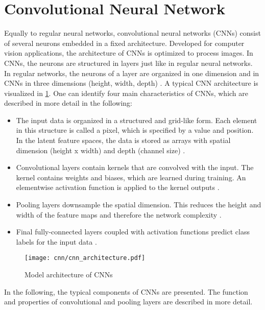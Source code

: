 \section{Convolutional Neural Network}

Equally to regular neural networks, convolutional neural networks (CNNs) consist of several neurons embedded in a fixed architecture. Developed for computer vision applications, the architecture of CNNs is optimized to process images. In CNNs, the neurons are structured in layers just like in regular neural networks. In regular networks, the neurons of a layer are organized in one dimension and in CNNs in three dimensions (height, width, depth) \cite{OShea2015}. A typical CNN architecture is visualized in \ref{fig:CNN_overview}. One can identify four main characteristics of CNNs, which are described in more detail in the following:

\begin{itemize}
    \item [1.] The input data is organized in a structured and grid-like form. Each element in this structure is called a pixel, which is specified by a value and position. In the latent feature spaces, the data is stored as arrays with spatial dimension (height x width) and depth (channel size) \cite{OShea2015}.
    
    \item [2.] Convolutional layers contain kernels that are convolved with the input. The kernel contains weights and biases, which are learned during training. An elementwise activation function is applied to the kernel outputs \cite{OShea2015}.
    
    \item [3.]  Pooling layers downsample the spatial dimension. This reduces the height and width of the feature maps and therefore the network complexity \cite{OShea2015}.
    
    \item [4.] Final fully-connected layers coupled with activation functions predict class labels for the input data \cite{OShea2015}.
\end{itemize}

\begin{figure}[H]
  \centering
  \texttt{[image: cnn/cnn\_architecture.pdf]}
  \caption {Model architecture of CNNs \cite{OShea2015}}
  \label{fig:CNN_overview}
\end{figure}

In the following, the typical components of CNNs are presented. The function and properties of convolutional and pooling layers are described in more detail.  

